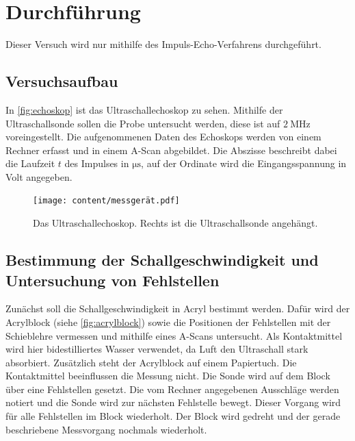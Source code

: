 \section{Durchführung}
\label{sec:Durchführung}

Dieser Versuch wird nur mithilfe des Impuls-Echo-Verfahrens durchgeführt.

\subsection{Versuchsaufbau}
\label{subsec:versuchsaufbau}
In \autoref{fig:echoskop} ist das Ultraschallechoskop zu sehen.
Mithilfe der Ultraschallsonde sollen die Probe untersucht werden, diese ist auf $\SI{2}{\mega\hertz}$ voreingestellt.
Die aufgenommenen Daten des Echoskops werden von einem Rechner erfasst und in einem A-Scan abgebildet.
Die Abszisse beschreibt dabei die Laufzeit $t$ des Impulses in $\si{\micro\second}$, auf der Ordinate wird die Eingangsspannung in Volt angegeben.

\begin{figure}
    \centering
    \texttt{[image: content/messgerät.pdf]}
    \caption{Das Ultraschallechoskop. Rechts ist die Ultraschallsonde angehängt.}
    \label{fig:echoskop}
\end{figure}

\subsection{Bestimmung der Schallgeschwindigkeit und Untersuchung von Fehlstellen}
\label{aufgabe_1}
Zunächst soll die Schallgeschwindigkeit in Acryl bestimmt werden.
Dafür wird der Acrylblock (siehe \autoref{fig:acrylblock}) sowie die Positionen der Fehlstellen mit der Schieblehre vermessen und mithilfe eines A-Scans untersucht.
Als Kontaktmittel wird hier bidestilliertes Wasser verwendet, da Luft den Ultraschall stark absorbiert.
Zusätzlich steht der Acrylblock auf einem Papiertuch.
Die Kontaktmittel beeinflussen die Messung nicht.
Die Sonde wird auf dem Block über eine Fehlstellen gesetzt.
Die vom Rechner angegebenen Ausschläge werden notiert und die Sonde wird zur nächsten Fehlstelle bewegt.
Dieser Vorgang wird für alle Fehlstellen im Block wiederholt.
Der Block wird gedreht und der gerade beschriebene Messvorgang nochmals wiederholt.

